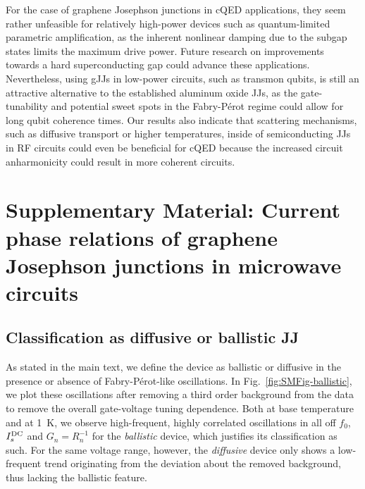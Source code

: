 For the case of graphene Josephson junctions in cQED applications, they seem rather unfeasible for relatively high-power devices such as quantum-limited parametric amplification, as the inherent nonlinear damping due to the subgap states limits the maximum drive power.
%
Future research on improvements towards a hard superconducting gap could advance these applications.
%
Nevertheless, using gJJs in low-power circuits, such as transmon qubits, is still an attractive alternative to the established aluminum oxide JJs, as the gate-tunability and potential sweet spots in the Fabry-Pérot regime could allow for long qubit coherence times.
%
Our results also indicate that scattering mechanisms, such as diffusive transport or higher temperatures, inside of semiconducting JJs in RF circuits could even be beneficial for cQED because the increased circuit anharmonicity could result in more coherent circuits.


\clearpage
\pagebreak




\section{Supplementary Material: Current phase relations of graphene Josephson junctions in microwave circuits}

\subsection{Classification as diffusive or ballistic JJ}\label{sec:ballistic}

As stated in the main text, we define the device as ballistic or diffusive in the presence or absence of Fabry-Pérot-like oscillations.
%
In Fig.~\ref{fig:SMFig-ballistic}, we plot these oscillations after removing a third order background from the data to remove the overall gate-voltage tuning dependence.
%
Both at base temperature and at \SI{1}{\kelvin}, we observe high-frequent, highly correlated oscillations in all off $f_0$, $I_s^{\rm DC}$ and $G_n=R_n^{-1}$ for the \textit{ballistic} device, which justifies its classification as such.
%
For the same voltage range, however, the \textit{diffusive} device only shows a low-frequent trend originating from the deviation about the removed background, thus lacking the ballistic feature.

